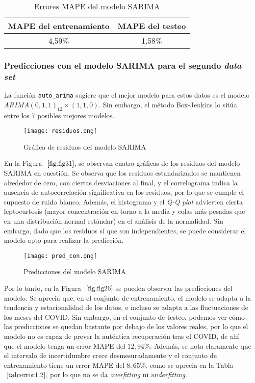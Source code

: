 \documentclass[12pt,twoside]{article}
\begin{document}
\begin{table}[h]
\centering
\begin{tabular}{cc}
\hline
\textbf{MAPE del entrenamiento} & \textbf{MAPE del testeo} \\ \hline
4,59\% & 1,58\% \\ \hline
\end{tabular}
\caption{Errores MAPE del modelo SARIMA}
\label{tab:error1.1}
\end{table}


\subsubsection{Predicciones con el modelo SARIMA para el segundo \textit{data set}}\label{sec:37}

La función \texttt{auto\_arima} sugiere que el mejor modelo para estos datos es el modelo $ARIMA(0,1,1)_{12} \times (1,1,0)$. Sin embargo, el método Box-Jenkins lo sitúa entre los 7 posibles mejores modelos. 

\begin{figure}[h]
    \centering
    \texttt{[image: residuos.png]}
    \caption{Gráfica de residuos del modelo SARIMA} 
    \label{fig:fig31}
\end{figure}

En la Figura $~\ref{fig:fig31}$, se observan cuatro gráficas de los residuos del modelo SARIMA en cuestión. Se observa que los residuos estandarizados se mantienen alrededor de cero, con ciertas desviaciones al final, y el correlograma indica la ausencia de autocorrelación significativa en los residuos, por lo que se cumple el supuesto de ruido blanco. Además, el histograma y el \textit{Q-Q plot} advierten cierta leptocurtosis (mayor concentración en torno a la media y colas más pesadas que en una distribución normal estándar) en el análisis de la normalidad. Sin embargo, dado que los residuos sí que son independientes, se puede considerar el modelo apto para realizar la predicción.

\begin{figure}[h]
    \centering
    \texttt{[image: pred\_con.png]}
    \caption{Predicciones del modelo SARIMA} 
    \label{fig:fig26}
\end{figure}

Por lo tanto, en la Figura $~\ref{fig:fig26}$ se pueden observar las predicciones del modelo. Se aprecia que, en el conjunto de entrenamiento, el modelo se adapta a la tendencia y estacionalidad de los datos, e incluso se adapta a las fluctuaciones de los meses del COVID. Sin embargo, en el conjunto de testeo, podemos ver cómo las predicciones se quedan bastante por debajo de los valores reales, por lo que el modelo no es capaz de prever la auténtica recuperación tras el COVID, de ahí que el modelo tenga un error MAPE del $12,94\%$. Además, se nota claramente que el intervalo de incertidumbre crece desmesuradamente y el conjunto de entrenamiento tiene un error MAPE del $8,65\%$,  como se aprecia en la Tabla $~\ref{tab:error1.2}$, por lo que no se da \textit{overfitting} ni \textit{underfitting}.
\end{document}
